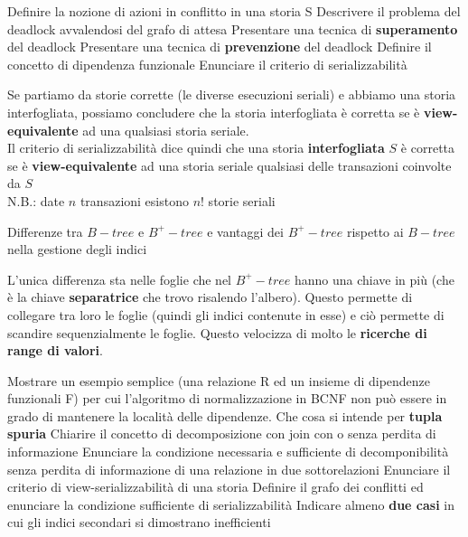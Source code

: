 \documentclass{exam}
\begin{document}
\begin{questions}
\begin{solution}
\begin{description}
          \end{description}
    \end{solution}
    \question Definire la nozione di azioni in conflitto in una storia S
    \question Descrivere il problema del deadlock avvalendosi del grafo di attesa
    \question Presentare una tecnica di \textbf{superamento} del deadlock
    \question Presentare una tecnica di \textbf{prevenzione} del deadlock
    \question Definire il concetto di dipendenza funzionale
    \question Enunciare il criterio di serializzabilità
    \begin{solution}
        Se partiamo da storie corrette (le diverse esecuzioni  seriali) e abbiamo una storia interfogliata, possiamo  concludere che la storia interfogliata è corretta se è \textbf{view-equivalente} ad una qualsiasi storia seriale.\\
        Il criterio di serializzabilità dice quindi che una storia \textbf{interfogliata} $S$ è corretta se è \textbf{view-equivalente} ad una storia seriale qualsiasi delle transazioni coinvolte da $S$ \\
        N.B.: date $n$ transazioni esistono $n!$ storie seriali
    \end{solution}
    \question Differenze tra $B-tree$ e $B^{+}-tree$ e vantaggi dei $B^{+}-tree$ rispetto ai $B-tree$ nella gestione degli indici
    \begin{solution}
        L'unica differenza sta nelle foglie che nel $B^{+}-tree$ hanno una chiave in più (che è la chiave \textbf{separatrice} che trovo risalendo l'albero). 
        Questo permette di collegare tra loro le foglie (quindi gli indici contenute in esse) e ciò permette di scandire sequenzialmente le foglie. Questo 
        velocizza di molto le \textbf{ricerche di range di valori}.
    \end{solution}
    \question Mostrare un esempio semplice (una relazione R ed un insieme di dipendenze funzionali F) per cui  l’algoritmo di normalizzazione in BCNF non può essere in grado di mantenere la località delle dipendenze. 
    \question Che cosa si intende per \textbf{tupla spuria}
    \question Chiarire il concetto di decomposizione con join con o senza perdita di informazione
    \question Enunciare la condizione necessaria e sufficiente di decomponibilità senza perdita di informazione di una relazione in due sottorelazioni
    \question Enunciare il criterio di view-serializzabilità di una storia
    \question Definire il grafo dei conflitti ed enunciare la condizione sufficiente di serializzabilità
    \question Indicare almeno \textbf{due casi} in cui gli indici secondari si dimostrano inefficienti

\end{questions}
\end{document}
